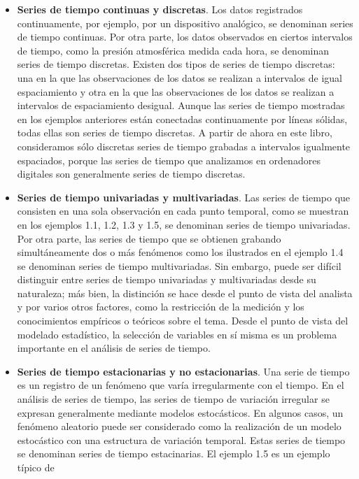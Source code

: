\documentclass[12pt,]{krantz}
\theoremstyle{definition}
\theoremstyle{definition}
\theoremstyle{definition}
\theoremstyle{remark}
\begin{document}
\begin{itemize}
\item
  \textbf{Series de tiempo continuas y discretas}. Los datos registrados
  continuamente, por ejemplo, por un dispositivo analógico, se denominan
  series de tiempo continuas. Por otra parte, los datos observados en
  ciertos intervalos de tiempo, como la presión atmosférica medida cada
  hora, se denominan series de tiempo discretas. Existen dos tipos de
  series de tiempo discretas: una en la que las observaciones de los
  datos se realizan a intervalos de igual espaciamiento y otra en la que
  las observaciones de los datos se realizan a intervalos de
  espaciamiento desigual. Aunque las series de tiempo mostradas en los
  ejemplos anteriores están conectadas continuamente por líneas sólidas,
  todas ellas son series de tiempo discretas. A partir de ahora en este
  libro, consideramos sólo discretas series de tiempo grabadas a
  intervalos igualmente espaciados, porque las series de tiempo que
  analizamos en ordenadores digitales son generalmente series de tiempo
  discretas.
\item
  \textbf{Series de tiempo univariadas y multivariadas}. Las series de
  tiempo que consisten en una sola observación en cada punto temporal,
  como se muestran en los ejemplos 1.1, 1.2, 1.3 y 1.5, se denominan
  series de tiempo univariadas. Por otra parte, las series de tiempo que
  se obtienen grabando simultáneamente dos o más fenómenos como los
  ilustrados en el ejemplo 1.4 se denominan series de tiempo
  multivariadas. Sin embargo, puede ser difícil distinguir entre series
  de tiempo univariadas y multivariadas desde su naturaleza; más bien,
  la distinción se hace desde el punto de vista del analista y por
  varios otros factores, como la restricción de la medición y los
  conocimientos empíricos o teóricos sobre el tema. Desde el punto de
  vista del modelado estadístico, la selección de variables en sí misma
  es un problema importante en el análisis de series de tiempo.
\item
  \textbf{Series de tiempo estacionarias y no estacionarias}. Una serie
  de tiempo es un registro de un fenómeno que varía irregularmente con
  el tiempo. En el análisis de series de tiempo, las series de tiempo de
  variación irregular se expresan generalmente mediante modelos
  estocásticos. En algunos casos, un fenómeno aleatorio puede ser
  considerado como la realización de un modelo estocástico con una
  estructura de variación temporal. Estas series de tiempo se denominan
  series de tiempo estacinarias. El ejemplo 1.5 es un ejemplo típico de

\end{itemize}
\end{document}

